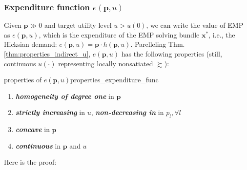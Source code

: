 \subsubsection*{Expenditure function $e(\mathbf{p},u)$}
Given $\mathbf{p}\gg 0$ and target utility level $u> u(0)$, we can write the value of EMP as $e(\mathbf{p},u)$, which is the expenditure of the EMP solving bundle $\mathbf{x}^*$, i.e., the Hicksian demand: $e(\mathbf{p},u) = \mathbf{p}\cdot h(\mathbf{p},u)$.
Parelleling Thm.\ref{thm:properties_indirect_u}, $e(\mathbf{p},u)$ has the following properties (still, continuous $u(\cdot)$ representing locally nonsatiated $\succsim$):
\begin{theorem}{properties of $e(\mathbf{p},u)$}{properties_expenditure_func}
    \begin{enumerate}
        \item \textit{\textbf{homogeneity of degree one}} in $\mathbf{p}$
        \item \textit{\textbf{strictly increasing}} in $u$, \textit{\textbf{non-decreasing in}} in $p_l,\forall l$
        \item \textit{\textbf{concave}} in $\mathbf{p}$
        \item \textit{\textbf{continuous}} in $\mathbf{p}$ and $u$
    \end{enumerate}
\end{theorem}
Here is the proof:
